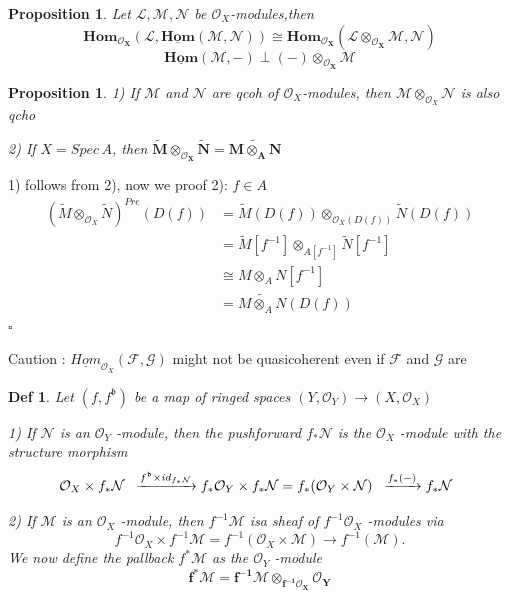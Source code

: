 \documentclass{article}
\newtheorem{definition}[theorem]{Def}
\newtheorem{proposition}[theorem]{Proposition}
\newenvironment{Proof}{{\noindent \indent \it Proof:\quad}}{\hfill $\square$\par}
\begin{document}
\begin{proposition}
    Let $\mathcal L,\mathcal M,\mathcal N$ be $\mathcal O_X$-modules,then  
    $$
    \bm{Hom_{\mathcal O_X}(\mathcal L,\underline{Hom}(\mathcal M,\mathcal N))\cong
    Hom_{\mathcal O_X}(\mathcal L\otimes_{\mathcal O_X}\mathcal M,\mathcal N)}
    $$
$$\bm{\underline{Hom}(\mathcal M,-)\perp
(-)\otimes_{\mathcal O_X}\mathcal M}$$
\end{proposition}

\begin{proposition}
    1) If $\mathcal M$ and $\mathcal N$ are qcoh of $\mathcal O_X$-modules, then $\mathcal M\otimes_{\mathcal O_X}\mathcal N$ is also qcho

    2) If $X=Spec\,A$, then $\bm{\widetilde M\otimes_{\mathcal O_X}\widetilde N=\widetilde {M\otimes_{A}N}}$
    \label{prop 3.69}
\end{proposition}
\begin{Proof}
1) follows from 2), now we proof 2): $f\in A$
    \begin{align*}
\label{sup}
(\widetilde M\otimes_{\mathcal O_X}\widetilde N)^{Pre}(D(f))
&=\widetilde M(D(f))\otimes_{\mathcal O_X(D(f))}\widetilde N(D(f))\\
&=\widetilde M[f^{-1}]\otimes_{A[f^{-1}]}\widetilde N[f^{-1}]\\
&\cong  {M\otimes_{A}N}[f^{-1}]\\
&=\widetilde {M\otimes_{A}N}(D(f))
 \end{align*}
\end{Proof}

Caution : $\underline{Hom}_{\mathcal O_X}(\mathcal F,\mathcal G)$ might not be quasicoherent even if $\mathcal F$ and $\mathcal G$ are

\begin{definition}
Let $(f,f^{\mathfrak b})$ be a map of ringed spaces $(Y,{\mathcal{O}}_{Y})\to(X,{\mathcal{O}}_{X})$ 

1) If $\mathcal N$ is an ${\mathcal{O}}_{Y}$ -module, then the pushforward $f_{\ast}{\mathcal{N}}$ is the ${\mathcal{O}}_{X}$ -module with the structure morphism
$$
{\cal O}_{X}\times f_{\ast}{\cal N}\;\;
\xrightarrow{f^{\mathfrak b}\times id_{f_\ast\mathcal N}}
f_\ast{\cal O}_{Y}\times f_{\ast}{\cal N}
=f_{\ast}({\cal O}_{Y}\times{\cal N})\;\;
\xrightarrow{f_{\ast}(-)}
f_{\ast}{\cal N}\;\; 
$$

2) If $\mathcal{M}$ is an ${\mathcal{O}}_{X}$ -module, then $f^{-1}{\mathcal{M}}$ isa sheaf of $f^{-1}{\mathcal{O}}_{X}$ -modules via
$$
f^{-1}{\mathcal{O}}_{X}\times f^{-1}{\mathcal{M}}=f^{-1}({\mathcal{O}}_{X}\times{\mathcal{M}})\longrightarrow f^{-1}({\mathcal{M}}). 
$$
We now define the pallback $f^{*}{\mathcal{M}}$ as the ${\mathcal{O}}_{Y}$ -module
$$
\bm{f^{\ast}{\mathcal M}=f^{-1}{\mathcal M}\otimes_{f^{-1}\mathcal O_{X}}{\mathcal O}_{Y}} 
$$
\label{def 3.70}
\end{definition}
\end{document}
